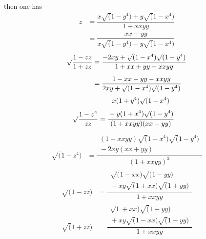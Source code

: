 then one has
\[
\begin{aligned}z&=\dfrac{x\surd(1-y^4)+y\surd(1-x^4)}{1+xxyy}\\[6pt]&=\dfrac{xx-yy}{x\surd(1-y^4)-y\surd(1-x^4)}\end{aligned}
\]
\[
\begin{aligned}\surd\dfrac{1-zz}{1+zz}&=\dfrac{-2xy+\surd(1-x^4)\surd(1-y^4)}{1+xx+yy-xxyy}\\[6pt]&=\dfrac{1-xx-yy-xxyy}{2xy+\surd(1-x^4)\surd(1-y^4)}\end{aligned}
\]
\[
\begin{aligned}\surd\dfrac{1-z^4}{zz}&=\dfrac{\begin{gathered}x(1+y^4)\surd(1-x^4)\\[3pt]{}-y(1+x^4)\surd(1-y^4)\end{gathered}}{(1+xxyy)(xx-yy)}\end{aligned}
\]
\[
\begin{aligned}\surd(1-z^4)&=\dfrac{\begin{gathered}(1-xxyy)\surd(1-x^4)\surd(1-y^4)\\[3pt]{}-2xy(xx+yy)\end{gathered}}{(1+xxyy)^2}\end{aligned}
\]
\[
\begin{aligned}\surd(1-zz)&=\dfrac{\begin{gathered}\surd(1-xx)\surd(1-yy)\\[3pt]{}-xy\surd(1+xx)\surd(1+yy)\end{gathered}}{1+xxyy}\end{aligned}
\]
\[
\begin{aligned}\surd(1+zz)&=\dfrac{\begin{gathered}\surd1+xx)\surd(1+yy)\\[3pt]{}+xy\surd(1-xx)\surd(1-yy)\end{gathered}}{1+xxyy}\end{aligned}
\]

